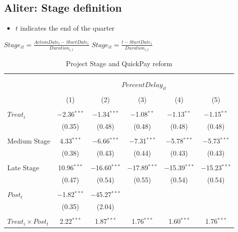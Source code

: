 \documentclass[
]{article}
\providecommand{\tightlist}{%
  \setlength{\itemsep}{0pt}\setlength{\parskip}{0pt}}
\begin{document}
\hypertarget{aliter-stage-definition}{%
\subsection{Aliter: Stage definition}\label{aliter-stage-definition}}

\begin{itemize}
\tightlist
\item
  \(t\) indicates the end of the quarter
\end{itemize}

\(Stage_{it}=\frac{ActionDate_{t}-StartDate_i}{Duration_{i,t}}\)
\(Stage_{it}=\frac{t-StartDate_i}{Duration_{i,t}}\)

\begin{table}[H] \centering 
  \caption{Project Stage and QuickPay reform} 
  \label{} 
\small 
\begin{tabular}{@{\extracolsep{-2pt}}lccccc} 
\\[-1.8ex]\hline 
\hline \\[-1.8ex] 
\\[-1.8ex] & \multicolumn{5}{c}{$PercentDelay_{it}$  } \\ 
\\[-1.8ex] & (1) & (2) & (3) & (4) & (5)\\ 
\hline \\[-1.8ex] 
 $Treat_i$ & $-$2.36$^{***}$ & $-$1.34$^{***}$ & $-$1.08$^{**}$ & $-$1.13$^{**}$ & $-$1.15$^{**}$ \\ 
  & (0.35) & (0.48) & (0.48) & (0.48) & (0.48) \\ 
  & & & & & \\ 
 Medium Stage & 4.33$^{***}$ & $-$6.66$^{***}$ & $-$7.31$^{***}$ & $-$5.78$^{***}$ & $-$5.73$^{***}$ \\ 
  & (0.38) & (0.43) & (0.44) & (0.43) & (0.43) \\ 
  & & & & & \\ 
 Late Stage & 10.96$^{***}$ & $-$16.60$^{***}$ & $-$17.89$^{***}$ & $-$15.39$^{***}$ & $-$15.23$^{***}$ \\ 
  & (0.47) & (0.54) & (0.55) & (0.54) & (0.54) \\ 
  & & & & & \\ 
 $Post_t$ & $-$1.82$^{***}$ & $-$45.27$^{***}$ &  &  &  \\ 
  & (0.35) & (2.04) &  &  &  \\ 
  & & & & & \\ 
 $Treat_i \times Post_t$ & 2.22$^{***}$ & 1.87$^{***}$ & 1.76$^{***}$ & 1.60$^{***}$ & 1.76$^{***}$ \\ 

\end{tabular}
\end{table}
\end{document}
